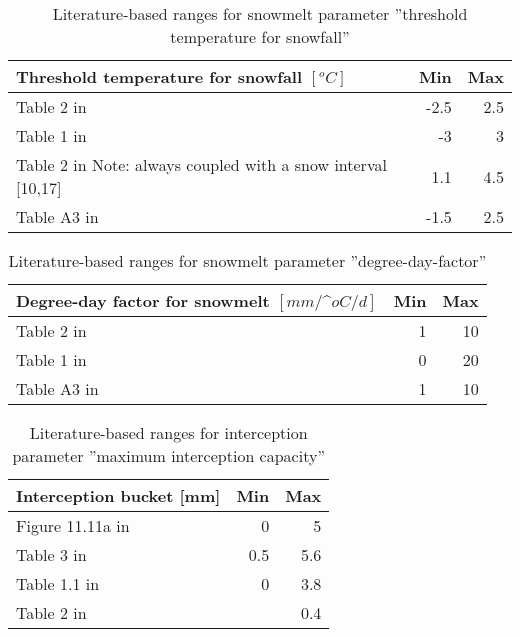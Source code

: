 \begin{table}[htbp]
  \centering
  \caption[References: Threshold temperature for snowfall]{Literature-based ranges for snowmelt parameter ''threshold temperature for snowfall''}
    \begin{tabular}{lrr}
    \toprule
    \textbf{Threshold temperature for snowfall $[^oC]$} & \textbf{Min} & \textbf{Max} \\
    \midrule
    Table 2 in \cite{Seibert1997} & -2.5  & 2.5 \\
    Table 1 in \cite{Kollat2012} & -3    & 3 \\
    Table 2 in \cite{Kienzle2008} Note: always coupled with a snow interval [10,17] & 1.1   & 4.5 \\
    Table A3 in \cite{Seibert2012} & -1.5  & 2.5 \\
    \bottomrule
    \end{tabular}%
  \label{tab:sm4_ts}%
\end{table}%

\begin{table}[htbp]
  \centering
  \caption[References: Degree-day-factor]{Literature-based ranges for snowmelt parameter ''degree-day-factor''}
    \begin{tabular}{lrr}
	\toprule
    \textbf{Degree-day factor for snowmelt $[mm/\^oC/d]$} & \textbf{Min} & \textbf{Max} \\
	\midrule
    Table 2 in \cite{Seibert1997} & 1     & 10 \\
    Table 1 in \cite{Kollat2012} & 0     & 20 \\
    Table A3 in \cite{Seibert2012} & 1     & 10 \\
	\bottomrule
    \end{tabular}%
  \label{tab:sm4_ddf}%
\end{table}%

\begin{table}[htbp]
  \centering
  \caption[References: Interception capacity]{Literature-based ranges for interception parameter ''maximum interception capacity''}
    \begin{tabular}{lrr}
    \toprule
    \textbf{Interception bucket [mm]} & \textbf{Min} & \textbf{Max} \\
    \midrule
    Figure 11.11a  in \cite{Chiew2002} & 0     & 5 \\
    Table 3 in \cite{Chiew1994} & 0.5   & 5.6 \\
    Table 1.1 in \cite{Gerrits2010} & 0     & 3.8 \\
    Table 2 in \cite{Son2007} &       & 0.4 \\
    \bottomrule
    \end{tabular}%
  \label{tab:sm4_int}%
\end{table}%

